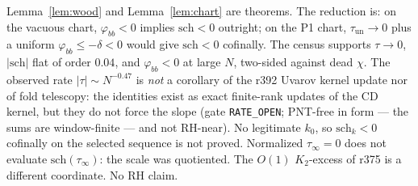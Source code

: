 \documentclass[11pt]{article}
\theoremstyle{remark}
\newcommand{\sch}{\mathrm{sch}}
\begin{document}
Lemma~\ref{lem:wood} and Lemma~\ref{lem:chart} are theorems.
The reduction is: on the vacuous chart, $\varphi_{bb}<0$
implies $\sch<0$ outright; on the P1 chart,
$\tau_{\mathrm{un}}\to 0$ plus a uniform $\varphi_{bb}\le-\delta<0$
would give $\sch<0$ cofinally.
The census supports $\tau\to 0$, $|\sch|$ flat of order $0.04$,
and $\varphi_{bb}<0$ at large $N$, two-sided against dead $\chi$.
The observed rate $|\tau|\sim N^{-0.47}$ is \emph{not} a
corollary of the r392 Uvarov kernel update nor of fold
telescopy: the identities exist as exact finite-rank updates
of the CD kernel, but they do not force the slope
(gate \texttt{RATE\_OPEN}; PNT-free in form --- the sums are
window-finite --- and not RH-near).
No legitimate $k_{0}$, so $\sch_{k}<0$ cofinally on the
selected sequence is not proved.
Normalized $\tau_{\infty}=0$ does not evaluate $\sch(\tau_{\infty})$:
the scale was quotiented.
The $O(1)$ $K_{2}$-excess of r375 is a different coordinate.
No RH claim.
\end{document}
